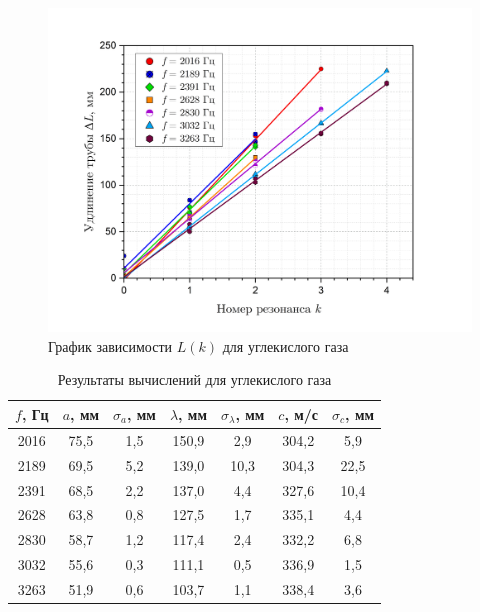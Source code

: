 \documentclass[a4paper, 12pt]{article}
\begin{document}
            \begin{figure}[H]
                \centering
                \includegraphics[scale = 0.5]{images/L(k)_CO2.png}
                \caption{График зависимости $L(k)$ для углекислого газа}
                \label{graph2}
            \end{figure}

            \begin{table}[H]
                \centering
                \begin{tabular}{|c|c|c|c|c|c|c|}
                \hline
                    $f$, Гц & $a$, мм & $\sigma_a$, мм & $\lambda$, мм & $\sigma_\lambda$, мм & $c$, м/с & $\sigma_c$, мм \\ \hline
                    2016 & 75,5 & 1,5 & 150,9 & 2,9  & 304,2 & 5,9   \\ \hline
                    2189 & 69,5 & 5,2 & 139,0 & 10,3 & 304,3 & 22,5  \\ \hline
                    2391 & 68,5 & 2,2 & 137,0 & 4,4  & 327,6 & 10,4  \\ \hline
                    2628 & 63,8 & 0,8 & 127,5 & 1,7  & 335,1 & 4,4   \\ \hline
                    2830 & 58,7 & 1,2 & 117,4 & 2,4 & 332,2 & 6,8    \\ \hline
                    3032 & 55,6 & 0,3 & 111,1 & 0,5 & 336,9 & 1,5    \\ \hline
                    3263 & 51,9 & 0,6 & 103,7 & 1,1 & 338,4 & 3,6    \\ \hline
                \end{tabular}
                \caption{Результаты вычислений для углекислого газа}
	        \label{tab:resCO2}
            \end{table}
\end{document}
